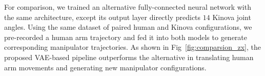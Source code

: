 
For comparison, we trained an alternative fully-connected neural network with the same architecture, except its output layer directly predicts $14$ Kinova joint angles. Using the same dataset of paired human and Kinova configurations, we pre-recorded a human arm trajectory and fed it into both models to generate corresponding manipulator trajectories. As shown in Fig~\ref{fig:comparsion_zx}, the proposed VAE-based pipeline outperforms the alternative in translating human arm movements and generating new manipulator configurations.
 

